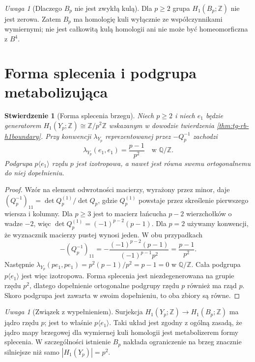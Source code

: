 \documentclass[11pt,a4paper]{report}
\numberwithin{equation}{section}
\theoremstyle{plain}
\newtheorem{stwierdzenie}[twierdzenie]{Stwierdzenie}
\theoremstyle{definition}
\theoremstyle{remark}
\newtheorem{uwaga}[twierdzenie]{Uwaga}
\begin{document}
\begin{uwaga}[Dlaczego $B_p$ nie jest zwykłą kulą]
Dla $p\geq2$ grupa $H_1(B_p;\mathbb Z)$
nie jest zerowa. Zatem $B_p$ ma homologię kuli
wyłącznie ze współczynnikami wymiernymi;
nie jest całkowitą kulą homologii ani
nie może być homeomorficzna z $B^4$.
\end{uwaga}

\section{Forma splecenia i podgrupa metabolizująca}
\label{sec:tg-rb-linkingform}

\begin{stwierdzenie}[Forma splecenia brzegu]
\label{prop:tg-rb-linkingform}
Niech $p\geq2$ i niech $e_1$ będzie generatorem
$H_1(Y_p;\mathbb Z)\cong\mathbb Z/p^2\mathbb Z$
wskazanym w dowodzie twierdzenia
\ref{thm:tg-rb-h1boundary}. Przy konwencji
$\lambda_{Y_p}$ reprezentowanej przez $-Q_p^{-1}$
zachodzi
\[
\lambda_{Y_p}(e_1,e_1)=\frac{p-1}{p^2}
\quad\text{w }\mathbb Q/\mathbb Z.
\]
Podgrupa $p\langle e_1\rangle$ rzędu $p$ jest
izotropowa, a nawet jest równa swemu ortogonalnemu
do niej dopełnieniu.
\end{stwierdzenie}

\begin{proof}
Wzór na element odwrotności macierzy, wyrażony
przez minor, daje
$(Q_p^{-1})_{11}=\det Q_p^{(1)}/\det Q_p$,
gdzie $Q_p^{(1)}$ powstaje przez skreślenie pierwszego
wiersza i kolumny. Dla $p\geq3$ jest to
macierz łańcucha $p-2$ wierzchołków o wadze $-2$,
więc $\det Q_p^{(1)}=(-1)^{p-2}(p-1)$.
Dla $p=2$ używamy konwencji, że wyznacznik
macierzy pustej wynosi jeden. W obu przypadkach
\[
-(Q_p^{-1})_{11}=-\frac{(-1)^{p-2}(p-1)}{(-1)^{p-1}p^2}
=\frac{p-1}{p^2}.
\]
Następnie
$\lambda_{Y_p}(pe_1,pe_1)=p^2(p-1)/p^2=p-1=0$
w $\mathbb Q/\mathbb Z$. Cała podgrupa
$p\langle e_1\rangle$ jest więc izotropowa.
Forma splecenia jest niezdegenerowana na grupie
rzędu $p^2$, dlatego dopełnienie ortogonalne
podgrupy rzędu $p$ również ma rząd $p$.
Skoro podgrupa jest zawarta w swoim dopełnieniu,
to oba zbiory są równe.
\end{proof}

\begin{uwaga}[Związek z wypełnieniem]
Surjekcja $H_1(Y_p;\mathbb Z)\to H_1(B_p;\mathbb Z)$
ma jądro rzędu $p$; jest to właśnie
$p\langle e_1\rangle$.
Taki układ jest zgodny z ogólną zasadą,
że jądro mapy brzegowej dla wymiernej kuli homologii
jest metabolizerem formy splecenia.
W szczególności istnienie $B_p$ nakłada ograniczenie
na brzeg znacznie silniejsze niż samo $|H_1(Y_p)|=p^2$.
\end{uwaga}
\end{document}
